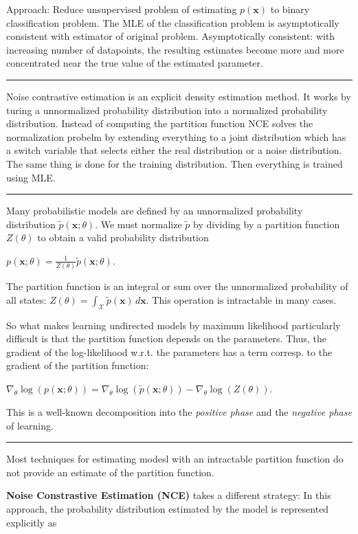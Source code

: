 \documentclass[a2paper,8pt]{extarticle}
\newcommand{\cX}{\mathcal{X}}
\renewcommand{\vec}[1]{\mathbf{#1}}
\newcommand{\vx}{\vec{x}}
\newcommand{\sep}{\vspace{0pt}\noindent\hrule\vspace{0pt}}
\newcommand{\sep}{\vspace{5pt}\noindent\hrule\vspace{5pt}}
\begin{document}
\begin{landscape}
\begin{multicols*}{7}
Approach: Reduce unsupervised problem of estimating $p(\vx)$ to binary
classification problem. The MLE of the classification problem is asymptotically
consistent with estimator of original problem. Asymptotically consistent: with
increasing number of datapoints, the resulting estimates become more and more
concentrated near the true value of the estimated parameter.

\sep

Noise contrastive estimation is an explicit density estimation method. It works
by turing a unnormalized probability distribution into a normalized probability
distribution. Instead of computing the partition function NCE solves the
normalization probelm by extending everything to a joint distribution which has
a switch variable that selects either the real distribution or a noise
distribution. The same thing is done for the training distribution. Then
everything is trained using MLE.

\sep

Many probabilistic models are defined by an unnormalized probability
distribution $\tilde{p}(\vx;\theta)$. We must normalize $\tilde{p}$ by dividing
by a partition function $Z(\theta)$ to obtain a valid probability distribution

$
p(\vx;\theta)
=
\frac{1}{Z(\theta)}\tilde{p}(\vx;\theta).
$

The partition function is an integral or sum over the unnormalized probability
of all states: $Z(\theta)=\int_{\cX} \tilde{p}(\vx)\,d\vx$. This operation is
intractable in many cases.

So what makes learning undirected models by maximum likelihood particularly
difficult is that the partition function depends on the parameters. Thus, the
gradient of the log-likelihood w.r.t. the parameters has a term corresp. to the
gradient of the partition function:

$
\nabla_{\theta}\log(p(\vx;\theta))
=
\nabla_{\theta}\log(\tilde{p}(\vx;\theta))
-\nabla_{\theta}\log(Z(\theta)).
$

This is a well-known decomposition into the \emph{positive phase} and the
\emph{negative phase} of learning.

\sep

Most techniques for estimating modesl with an intractable partition function do
not provide an estimate of the partition function.

\textbf{Noise Constrastive Estimation (NCE)} takes a different strategy: In this
approach, the probability distribution estimated by the model is represented
explicitly as


\end{multicols*}
\end{landscape}
\end{document}
